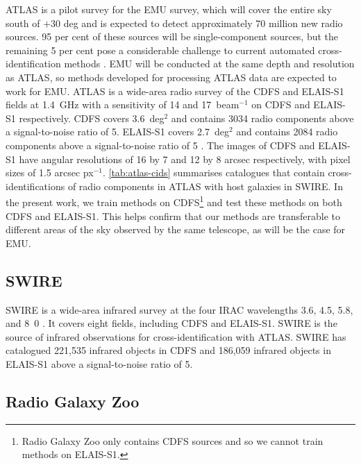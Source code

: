     ATLAS is a pilot survey for the EMU \citep{norris11} survey, which will
    cover the entire sky south of $+30$ deg and is expected to detect
    approximately 70 million new radio sources. {95 per cent of these sources
    will be single-component sources, but the remaining 5 per cent pose a
    considerable challenge to current automated cross-identification methods
    \citep{norris11}.} EMU will be conducted at the same depth and resolution
    as ATLAS, so methods developed for processing ATLAS data are expected to
    work for EMU. ATLAS is a wide-area radio survey of the CDFS and ELAIS-S1
    fields at 1.4~GHz with a sensitivity of 14 and
    \unit{17}{\micro\jansky}~beam$^{-1}$ on CDFS and ELAIS-S1 respectively.
    CDFS covers 3.6~deg$^2$ and contains 3034 radio components above a
    signal-to-noise ratio of 5. ELAIS-S1 covers 2.7~deg$^2$ and contains 2084
    radio components above a signal-to-noise ratio of 5 \citep{franzen15}. The
    images of CDFS and ELAIS-S1 have angular resolutions of 16 by 7 and 12 by
    8 arcsec respectively, with pixel sizes of 1.5 arcsec px$^{-1}$.
    \autoref{tab:atlas-cids} summarises catalogues that contain
    cross-identifications of radio components in ATLAS with host galaxies in
    SWIRE. In the present work, we train methods on
    CDFS\footnote{{Radio Galaxy Zoo only contains CDFS sources and so
    we cannot train methods on ELAIS-S1.}} and test these methods on both CDFS
    and ELAIS-S1. This helps confirm that our methods are transferable to different
    areas of the sky observed by the same telescope, as will be the case for
    EMU.

  \subsection{SWIRE}\label{sec:atlas-xid-swire}

    SWIRE is a wide-area infrared
    survey at the four IRAC wavelengths 3.6, 4.5, 5.8, and
    \unit{8.0}{\micro\meter} \citep{lonsdale03swire, surace05swire}. It covers eight fields, including CDFS and ELAIS-S1. SWIRE is the source of infrared
    observations for cross-identification with ATLAS. SWIRE has catalogued 221,535
    infrared objects in CDFS and 186,059 infrared objects in ELAIS-S1 above a signal-to-noise ratio of 5.

  \subsection{Radio Galaxy Zoo}\label{sec:atlas-xid-rgz}

